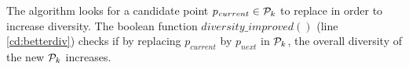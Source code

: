 \documentclass{vldb}
\begin{document}
\vspace{2pt}
The algorithm looks for a candidate point $p_{\mathit current} \in {\cal P}_k$ to replace in order to increase diversity. The boolean function $\mathit{diversity\_improved}()$ (line \ref{cd:betterdiv}) checks if by replacing $p_{current}$ by $p_{next}$ in ${\cal P}_k$, the overall diversity of the new ${\cal P}_k$ increases.





\end{document}
